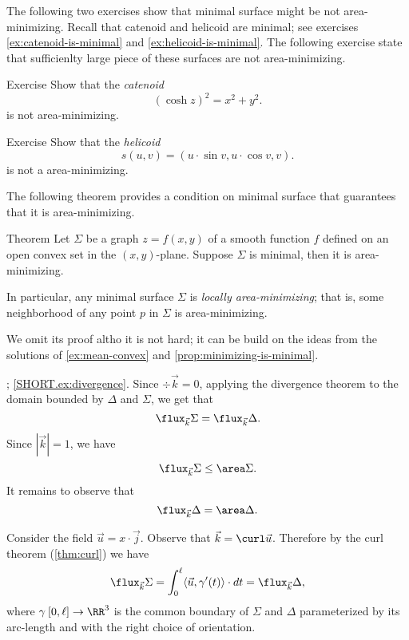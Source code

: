 The following two exercises show that minimal surface might be not area-minimizing.
Recall that catenoid and helicoid are minimal; see exercises \ref{ex:catenoid-is-minimal} and \ref{ex:helicoid-is-minimal}.
The following exercise state that sufficienlty large piece of these surfaces are not area-minimizing.

\begin{thm}{Exercise}\label{ex:catenoid-nonmin}
Show that the \emph{catenoid}
\[(\cosh z)^2=x^2+y^2.\]
is not area-minimizing.
\end{thm}

\begin{thm}{Exercise}\label{ex:helicoid-nonmin}
Show that the \emph{helicoid} 
\[s(u,v)=(u\cdot \sin v,u\cdot \cos v,v).\]
 is not a area-minimizing.
\end{thm}

The following theorem provides a condition on minimal surface that guarantees that it is area-minimizing.

\begin{thm}{Theorem}
Let $\Sigma$ be a graph $z=f(x,y)$ of a smooth function $f$ defined on an open convex set in the $(x,y)$-plane.
Suppose $\Sigma$ is minimal, then it is area-minimizing.

In particular, any minimal surface $\Sigma$ is \emph{locally area-minimizing};
that is, some neighborhood of any point $p$ in $\Sigma$ is area-minimizing.
\end{thm}

We omit its proof altho it is not hard;
it can be build on the ideas from the solutions of \ref{ex:mean-convex} and \ref{prop:minimizing-is-minimal}.




\parbf{\ref{ex:divergence-1}}; \ref{SHORT.ex:divergence}.
Since $\div\vec k=0$, applying the divergence theorem to the domain bounded by $\Delta$ and $\Sigma$, we get that 
\[\flux_{\vec k}\Sigma=\flux_{\vec k}\Delta.\]
Since $|\vec k|=1$, we have 
\[\flux_{\vec k}\Sigma\le \area\Sigma.\]
It remains to observe that
\[\flux_{\vec k}\Delta=\area\Delta.\]


 Consider the field $\vec u=x\cdot\vec j$.
Observe that $\vec k=\curl \vec u$.
Therefore by the curl theorem (\ref{thm:curl}) we have 
\[\flux_{\vec k}\Sigma
=
\int_0^\ell\langle\vec u,\gamma'(t)\rangle\cdot dt
=
\flux_{\vec k}\Delta,\]
where $\gamma\:[0,\ell]\to\RR^3$ is the common boundary of $\Sigma$ and $\Delta$ parameterized by its arc-length and with the right choice of orientation.

